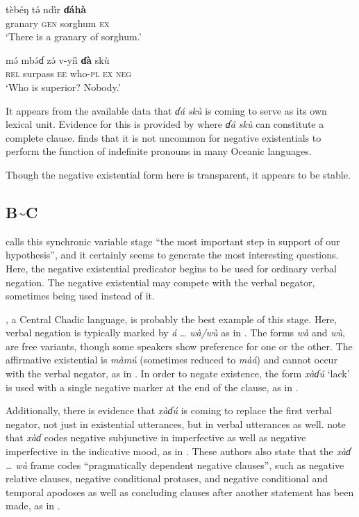 \documentclass[output=paper,draft,draftmode,colorlinks,citecolor=brown]{langscibook}
\begin{document}
\gll tèbéŋ t\'ə nd{ì}r \textbf{ɗáhà}\\
granary \textsc{gen} sorghum \textsc{ex}\\

\glt `There is a granary of sorghum.'
\ex\label{ex:mina-superior}

\gll m\'ə mb\'əɗ z\'ə v-{yíì} \textbf{ɗà} skù\\
\textsc{rel} surpass \textsc{ee} who-\textsc{pl} \textsc{ex} \textsc{neg}\\

\glt `Who is superior? Nobody.'

\z
\z

It appears from the available data that \textit{ɗá} \textit{skù} is
coming to serve as its own lexical unit. Evidence for this is provided by
 where \textit{ɗá skù} can constitute a complete
clause. \citet{Haspelmath1997} finds that it is not uncommon for negative
existentials to perform the function of indefinite pronouns in many Oceanic
languages.

Though the negative existential form here is transparent, it appears to be
stable. 

\subsection{B{\textasciitilde}C}\label{sec:3:3.4}
\citet[9]{Croft1991} calls this synchronic variable stage ``the most important step in support of our hypothesis'', and it certainly seems to generate the most interesting questions. Here, the negative existential predicator begins to be used for ordinary verbal negation. The negative existential may compete with the verbal negator, sometimes being used instead of it. 

, a Central Chadic language, is probably the best example of this
stage. Here, verbal negation is typically marked by \textit{á} \ldots{}
\textit{wà/wù} as in . The forms \textit{wà} and
\textit{wù}, are free variants, though some speakers show preference for
one or the other. The affirmative existential is \textit{màm\'u}
(sometimes reduced to \textit{màá}) and cannot occur with the verbal
negator, as in .  In order to negate existence, the
form \textit{xàɗ\'u} `lack' is used with a single negative marker at the
end of the clause, as in .
  
Additionally, there is evidence that \textit{xàɗ\'u} is coming to replace
the first verbal negator, not just in existential utterances, but in verbal
utterances as well. \citet{FrajzyngierShay2002} note that \textit{xàɗ} codes negative subjunctive in
imperfective as well as negative imperfective in the indicative mood, as in
.  These authors also state that the \textit{xàɗ
\ldots{} wà} frame codes ``pragmatically dependent negative clauses'',
such as negative relative clauses, negative conditional protases, and
negative conditional and temporal apodoses as well as concluding clauses after another statement has been made, as in
.
\end{document}
